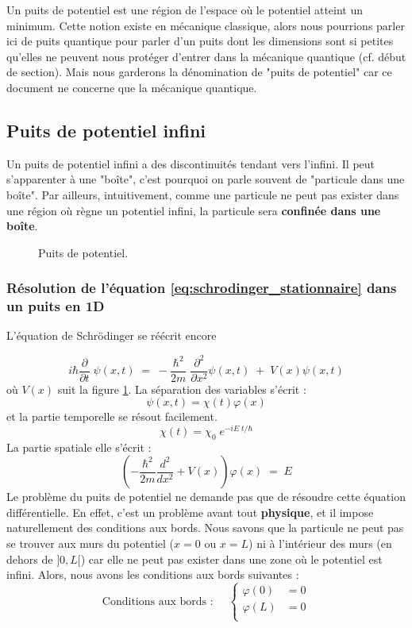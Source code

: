 \documentclass{book}
\begin{document}

Un puits de potentiel est une région de l'espace où le potentiel atteint un minimum. Cette notion existe en mécanique classique, alors nous pourrions parler ici de puits quantique pour parler d'un puits dont les dimensions sont si petites qu'elles ne peuvent nous protéger d'entrer dans la mécanique quantique (cf. début de section). Mais nous garderons la dénomination de "puits de potentiel" car ce document ne concerne que la mécanique quantique. \\


\subsection{Puits de potentiel infini}
Un puits de potentiel infini a des discontinuités tendant vers l'infini. Il peut s'apparenter à une "boîte", c'est pourquoi on parle souvent de "particule dans une boîte". Par ailleurs, intuitivement, comme une particule ne peut pas exister dans une région où règne un potentiel infini, la particule sera \textbf{confinée dans une boîte}.



\begin{figure}[h]
\centering
\caption{Puits de potentiel.}
\label{fig:puits_potentiel}
\end{figure}


\subsubsection{Résolution de l'équation \eqref{eq:schrodinger_stationnaire} dans un puits en 1D}
L'équation de Schrödinger se réécrit encore 



\begin{equation}\label{eq:schrodinger_1D}
i \hbar \dfrac{\partial }{\partial t} \; \psi(x, t) \; = \; -\dfrac{\hbar ^2}{2m} \; \dfrac{ \partial ^2}{\partial x^2} \psi(x, t) \; + \; V(x) \psi(x,t)
\end{equation}
où $V(x)$ suit la figure \ref{fig:puits_potentiel}.
La séparation des variables s'écrit :
$$\psi(x,t) = \chi(t) \varphi(x)$$ et la partie temporelle se résout facilement.
$$\chi(t) = \chi_0 \; e^{-iE\; t/\hbar}$$
La partie spatiale elle s'écrit :
$$
\left(-\dfrac{\hbar ^2}{2m} \dfrac{ d ^2}{d x^2 }  + V(x)\right) \varphi(x) \; = \; E  $$
Le problème du puits de potentiel ne demande pas que de résoudre cette équation différentielle. En effet, c'est un problème avant tout \textbf{physique}, et il impose naturellement des conditions aux bords. Nous savons que la particule ne peut pas se trouver aux murs du potentiel ($x=0$ ou $x=L$) ni à l'intérieur des murs (en dehors de $]0,L[$) car elle ne peut pas exister dans une zone où le potentiel est infini. Alors, nous avons les conditions aux bords suivantes :
$$\text{Conditions aux bords : }\quad 
\left\{
  \begin{array}{ll}
    \varphi(0) &= 0 \\
    \varphi(L) &= 0 \\
  \end{array}
\right.
$$
\end{document}
